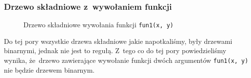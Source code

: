 \documentclass[10pt,t]{beamer}
\begin{document}
\begin{frame}
  \frametitle{Drzewo składniowe z~wywołaniem funkcji}


  \begin{figure}


    \caption{Drzewo składniowe wywołania funkcji
      \texttt{fun1(x, y)}}

    \label{fig:Scheme-of-CPU}

  \end{figure}





  Do tej pory wszystkie drzewa składniowe jakie napotkaliśmy, były drzewami
  binarnymi, jednak nie jest to regułą. Z~tego co do tej pory powiedzieliśmy
  wynika, że~drzewo zawierające wywołanie funkcji dwóch argumentów
  \texttt{fun1(x, y)} nie będzie drzewem binarnym.



\end{frame}
\end{document}
